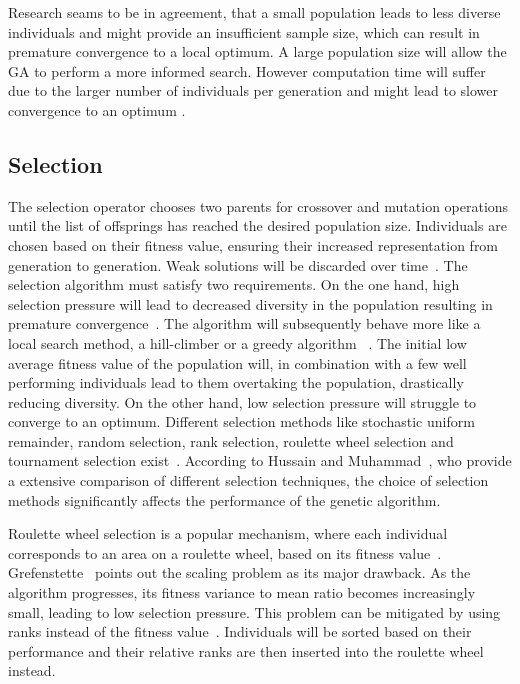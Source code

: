 Research seams to be in agreement, that a small population leads to less diverse individuals and might provide an insufficient sample size, which can result in premature convergence to a local optimum. A large population size will allow the GA to perform a more informed search. However computation time will suffer due to the larger number of individuals per generation and might lead to slower convergence to an optimum \cite{grefenstette_optimization_1986, katoch_review_2021, kacprzyk_parameter_2007}.

\subsection{Selection}
The selection operator chooses two parents for crossover and mutation operations until the list of offsprings has reached the desired population size. Individuals are chosen based on their fitness value, ensuring their increased representation from generation to generation. Weak solutions will be discarded over time~\cite{srinivas_genetic_1994}. The selection algorithm must satisfy two requirements. On the one hand, high selection pressure will lead to decreased diversity in the population resulting in premature convergence~\cite{katoch_review_2021}. The algorithm will subsequently behave more like a local search method, a hill-climber or a greedy algorithm ~\cite{kacprzyk_parameter_2007}. The initial low average fitness value of the population will, in combination with a few well performing individuals lead to them overtaking the population, drastically reducing diversity. On the other hand, low selection pressure will struggle to converge to an optimum. Different selection methods like stochastic uniform remainder, random selection, rank selection, roulette wheel selection and tournament selection exist~\cite{majumdar_genetic_2015}. According to Hussain and Muhammad~\cite{hussain_trade-off_2020}, who provide a extensive comparison of different selection techniques, the choice of selection methods significantly affects the performance of the genetic algorithm.

Roulette wheel selection is a popular mechanism, where each individual corresponds to an area on a roulette wheel, based on its fitness value~\cite{holland_adaptation_1992}. Grefenstette~\cite{grefenstette_optimization_1986} points out the scaling problem as its major drawback. As the algorithm progresses, its fitness variance to mean ratio becomes increasingly small, leading to low selection pressure. This problem can be mitigated by using ranks instead of the fitness value~\cite{katoch_review_2021}. Individuals will be sorted based on their performance and their relative ranks are then inserted into the roulette wheel instead. 

